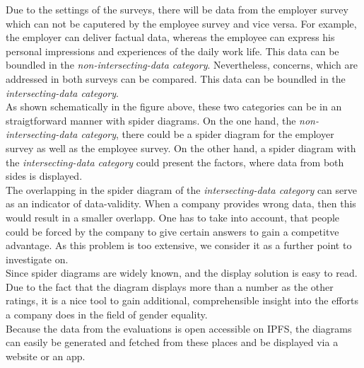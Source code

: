 Due to the settings of the surveys, there will be data from the employer survey which can not be caputered by the employee survey and vice versa. For example, the employer can deliver factual data, whereas the employee can express his personal impressions and experiences of the daily work life. This data can be boundled in the \textit{non-intersecting-data category}. Nevertheless, concerns, which are addressed in both surveys can be compared. This data can be boundled in the \textit{intersecting-data category}.\\
As shown schematically in the figure above, these two categories can be in an straigtforward manner with spider diagrams. On the one hand, the \textit{non-intersecting-data category}, there could be a spider diagram for the employer survey as well as the employee survey. On the other hand, a spider diagram with the \textit{intersecting-data category} could present the factors, where data from both sides is displayed.\\

The overlapping in the spider diagram of the \textit{intersecting-data category} can serve as an indicator of data-validity. When a company provides wrong data, then this would result in a smaller overlapp. One has to take into account, that people could be forced by the company to give certain answers to gain a competitve advantage. As this problem is too extensive, we consider it as a further point to investigate on.\\

Since spider diagrams are widely known, and the display solution is easy to read. Due to the fact that the diagram displays more than a number as the other ratings, it is a nice tool to gain additional, comprehensible insight into the efforts a company does in the field of gender equality.\\

Because the data from the evaluations is open accessible on IPFS, the diagrams can easily be generated and fetched from these places and be displayed via a website or an app.\\



